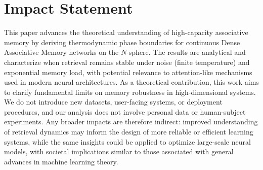 \documentclass{article}
\theoremstyle{plain}
\theoremstyle{definition}
\theoremstyle{remark}
\begin{document}






\section*{Impact Statement}

This paper advances the theoretical understanding of high-capacity associative memory by deriving thermodynamic phase boundaries for continuous Dense Associative Memory networks on the $N$-sphere. The results are analytical and characterize when retrieval remains stable under noise (finite temperature) and exponential memory load, with potential relevance to attention-like mechanisms used in modern neural architectures. As a theoretical contribution, this work aims to clarify fundamental limits on memory robustness in high-dimensional systems. We do not introduce new datasets, user-facing systems, or deployment procedures, and our analysis does not involve personal data or human-subject experiments. Any broader impacts are therefore indirect: improved understanding of retrieval dynamics may inform the design of more reliable or efficient learning systems, while the same insights could be applied to optimize large-scale neural models, with societal implications similar to those associated with general advances in machine learning theory.



\nocite{langley00}
\end{document}
